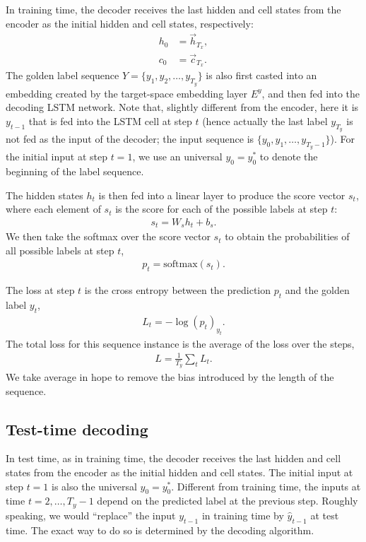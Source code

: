 \documentclass[11pt,a4paper]{article}
\begin{document}
In training time, the decoder receives the last hidden and cell states from the encoder as the initial hidden and cell states, respectively:
\begin{align}
	h_0 &= \overrightarrow{h}_{T_x}, \\
	c_0 &= \overrightarrow{c}_{T_x}.
\end{align}
The golden label sequence $Y = \{y_1, y_2, \dots, y_{T_y}\}$ is also first casted into an embedding created by the target-space embedding layer $E^y$, and then fed into the decoding LSTM network. Note that, slightly different from the encoder, here it is $y_{t-1}$ that is fed into the LSTM cell at step $t$ (hence actually the last label $y_{T_y}$ is not fed as the input of the decoder; the input sequence is $\{y_0, y_1, \dots, y_{T_y - 1}\}$). For the initial input at step $t = 1$, we use an universal $y_0 = y_0^*$ to denote the beginning of the label sequence.

The hidden states $h_t$ is then fed into a linear layer to produce the score vector $s_t$, where each element of $s_t$ is the score for each of the possible labels at step $t$:
\begin{align}
	s_t = W_s h_t + b_s.
\end{align}
We then take the softmax over the score vector $s_t$ to obtain the probabilities of all possible labels at step $t$,
\begin{align}
	\label{eq:pt} p_t = \textrm{softmax}(s_t).
\end{align}

The loss at step $t$ is the cross entropy between the prediction $p_t$ and the golden label $y_t$,
\begin{align}
	L_t = -\log (p_t)_{y_t}.
\end{align}
The total loss for this sequence instance is the average of the loss over the steps,
\begin{align}
	L = \frac{1}{T_y} \sum_t L_t.
\end{align}
We take average in hope to remove the bias introduced by the length of the sequence.



\subsection{Test-time decoding}

In test time, as in training time, the decoder receives the last hidden and cell states from the encoder as the initial hidden and cell states. The initial input at step $t = 1$ is also the universal $y_0 = y_0^*$. Different from training time, the inputs at time $t = 2, \dots, T_y - 1$ depend on the predicted label at the previous step. Roughly speaking, we would ``replace'' the input $y_{t-1}$ in training time by $\hat{y}_{t-1}$ at test time. The exact way to do so is determined by the decoding algorithm.
\end{document}
